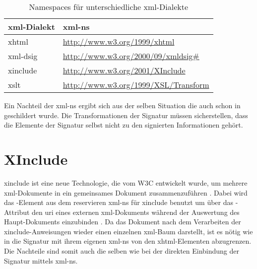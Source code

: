 \begin{table}
    \centering
    \begin{tabularx}{\textwidth}{ l X }
        \gls{xml}-Dialekt  & \gls{xml-ns} \\
        \hline
        \hline
        \gls{xhtml} & \url{http://www.w3.org/1999/xhtml} \\
        \hline
        \gls{xml-dsig} & \url{http://www.w3.org/2000/09/xmldsig\#} \\
        \hline
        \gls{xinclude} & \url{http://www.w3.org/2001/XInclude} \\
        \hline
        \gls{xslt} & \url{http://www.w3.org/1999/XSL/Transform} \\
        \hline
    \end{tabularx}
    \caption{Namespaces für unterschiedliche \protect\gls{xml}-Dialekte}
    \label{tab:xml-namespaces}
\end{table}



Ein Nachteil der \gls{xml-ns} ergibt sich aus der selben Situation die auch schon in  geschildert wurde. Die
Transformationen der Signatur müssen sicherstellen, dass die Elemente der Signatur selbst nicht zu den signierten Informationen gehört.

\section{XInclude}
\label{sec:Signaturbindung:XInclude}
\gls{xinclude} ist eine neue Technologie, die vom W3C entwickelt wurde, um mehrere \gls{xml}-Dokumente in ein gemeinsames Dokument zusammenzuführen
\cite{xinclude:w3c}. Dabei wird das -Element aus dem reservieren \gls{xml-ns} für \gls{xinclude} benutzt um über das
-Attribut den \gls{uri} eines externen \gls{xml}-Dokuments während der Auswertung des Haupt-Dokuments einzubinden \cite{xml:oreilly}. Da
das Dokument nach dem Verarbeiten der \gls{xinclude}-Anweisungen wieder einen einzelnen \gls{xml}-Baum darstellt, ist es nötig wie in
 die Signatur mit ihrem eigenen \gls{xml-ns} von den \gls{xhtml}-Elementen abzugrenzen. Die Nachteile sind somit auch die
selben wie bei der direkten Einbindung der Signatur mittels \gls{xml-ns}.

